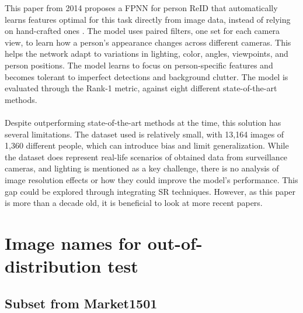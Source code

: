 This paper from 2014 proposes a \acf{FPNN} for person \acs{ReID} that automatically learns features optimal for this task directly from image data, instead of relying on hand-crafted ones \cite{Li2014DeepReID}. The model uses paired filters, one set for each camera view, to learn how a person’s appearance changes across different cameras. This helps the network adapt to variations in lighting, color, angles, viewpoints, and person positions. The model learns to focus on person-specific features and becomes tolerant to imperfect detections and background clutter. The model is evaluated through the Rank-1 metric, against eight different state-of-the-art methods.  
\\\\
Despite outperforming state-of-the-art methods at the time, this solution has several limitations. The dataset used is relatively small, with 13,164 images of 1,360 different people, which can introduce bias and limit generalization. While the dataset does represent real-life scenarios of obtained data from surveillance cameras, and lighting is mentioned as a key challenge, there is no analysis of image resolution effects or how they could improve the model’s performance. This gap could be explored through integrating \acs{SR} techniques. However, as this paper is more than a decade old, it is beneficial to look at more recent papers.

\section{Image names for out-of-distribution test}\label{app:out-of-dis}

\subsection{Subset from Market1501}

